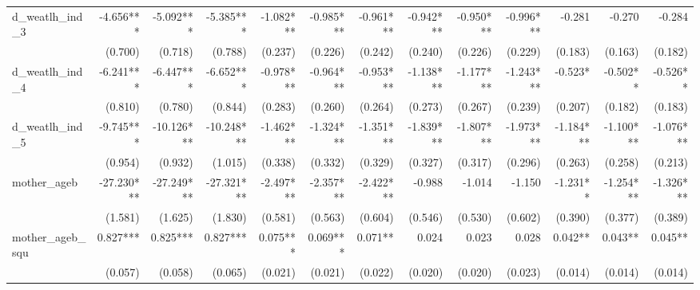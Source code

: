 \begin{tabular}{lrrrrrrrrrrrr}
d\_weatlh\_ind\_3                           &    -4.656*** &    -5.092*** &    -5.385*** &    -1.082*** &    -0.985*** &    -0.961*** &    -0.942*** &    -0.950*** &    -0.996*** &       -0.281 &       -0.270 &       -0.284 \\ 
                                            &      (0.700) &      (0.718) &      (0.788) &      (0.237) &      (0.226) &      (0.242) &      (0.240) &      (0.226) &      (0.229) &      (0.183) &      (0.163) &      (0.182) \\ 
d\_weatlh\_ind\_4                           &    -6.241*** &    -6.447*** &    -6.652*** &    -0.978*** &    -0.964*** &    -0.953*** &    -1.138*** &    -1.177*** &    -1.243*** &      -0.523* &     -0.502** &     -0.526** \\ 
                                            &      (0.810) &      (0.780) &      (0.844) &      (0.283) &      (0.260) &      (0.264) &      (0.273) &      (0.267) &      (0.239) &      (0.207) &      (0.182) &      (0.183) \\ 
d\_weatlh\_ind\_5                           &    -9.745*** &   -10.126*** &   -10.248*** &    -1.462*** &    -1.324*** &    -1.351*** &    -1.839*** &    -1.807*** &    -1.973*** &    -1.184*** &    -1.100*** &    -1.076*** \\ 
                                            &      (0.954) &      (0.932) &      (1.015) &      (0.338) &      (0.332) &      (0.329) &      (0.327) &      (0.317) &      (0.296) &      (0.263) &      (0.258) &      (0.213) \\ 
mother\_ageb                                &   -27.230*** &   -27.249*** &   -27.321*** &    -2.497*** &    -2.357*** &    -2.422*** &       -0.988 &       -1.014 &       -1.150 &     -1.231** &    -1.254*** &    -1.326*** \\ 
                                            &      (1.581) &      (1.625) &      (1.830) &      (0.581) &      (0.563) &      (0.604) &      (0.546) &      (0.530) &      (0.602) &      (0.390) &      (0.377) &      (0.389) \\ 
mother\_ageb\_squ                           &     0.827*** &     0.825*** &     0.827*** &     0.075*** &     0.069*** &      0.071** &        0.024 &        0.023 &        0.028 &      0.042** &      0.043** &      0.045** \\ 
                                            &      (0.057) &      (0.058) &      (0.065) &      (0.021) &      (0.021) &      (0.022) &      (0.020) &      (0.020) &      (0.023) &      (0.014) &      (0.014) &      (0.014) \\ 

\end{tabular}
